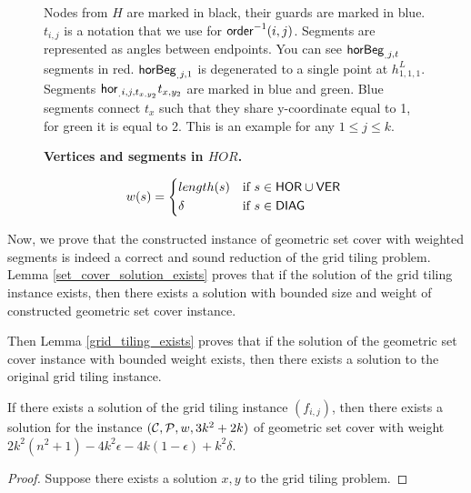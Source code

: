 {{{{\begin{figure}
\begin{tikzpicture}[main/.style = {draw, circle}]
\end{tikzpicture} 
\caption{\textbf{Vertices and segments in $HOR$.}}
Nodes from $H$ are marked in black, their guards are marked in blue.
$t_{i,j}$ is a notation that we use for $\order^{-1}(i,j)$.
Segments are represented as angles between endpoints.
You can see $\horbeg_{j,t}$ segments in \textcolor{beg_color}{red}.
$\horbeg_{j,1}$ is degenerated to a single point at $h_{1,1,1}^L$.
Segments $\hor_{i}{j}{t_{x,y_2}}{t_{x,y_2}}$
are marked in \textcolor{seg_color1}{blue} and \textcolor{seg_color2}{green}.
\textcolor{seg_color1}{Blue} segments connect $t_x$
such that they share y-coordinate equal to 1,
for \textcolor{seg_color2}{green} it is equal to 2.
This is an example for any $1 \le j \le k$.

\label{fig:segments_def}
\end{figure}

\begin{equation}
w(s) =
	\begin{cases*}
	  length(s) 			& if $s \in \allhor \cup \allver$ \\
	  \delta        & if $s \in \alldiag$
	\end{cases*}
\end{equation}

\newcommand{\solWeight}{2k^2(n^2+1) - 4k^2\epsilon -4k(1-\epsilon) +k^2\delta }

Now, we prove that the constructed instance of geometric set cover
with weighted segments is indeed a correct and sound reduction
of the grid tiling problem. Lemma \ref{set_cover_solution_exists}
proves that if the solution of the grid tiling instance exists,
then there exists a solution with bounded size and weight
of constructed geometric set cover instance.

Then Lemma \ref{grid_tiling_exists} proves that if the solution
of the geometric set cover instance with bounded weight exists,
then there exists a solution to the original grid tiling instance.

\begin{lemma}
\label{set_cover_solution_exists}
	If there exists a solution of the grid tiling instance $(f_{i,j})$,
	then there exists a solution for the instance $\instanceSetCover$
	of geometric set cover with weight $\solWeight$.
\end{lemma}

\begin{proof}
Suppose there exists a solution $x,y$ to the grid tiling problem.
	

\end{proof}}}}}
